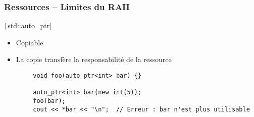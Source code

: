 \documentclass[C++.tex]{subfiles}
\begin{document}
\begin{frame}[fragile]
	\frametitle{Ressources -- Limites du RAII}
	\begin{alertblock}{\texttt|std::auto_ptr|}
		\begin{itemize}
			\item Copiable
			\item La copie transfère la responsabilité de la ressource
		\end{itemize}
	\end{alertblock}

	\begin{verbatim}
		void foo(auto_ptr<int> bar) {}

		auto_ptr<int> bar(new int(5));
		foo(bar);
		cout << *bar << "\n";  // Erreur : bar n'est plus utilisable
	\end{verbatim}

\end{frame}
\end{document}
